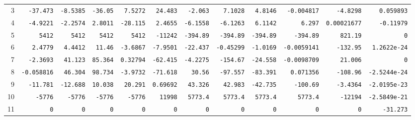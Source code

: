 \begin{landscape}
\begin{tabular}{rrrrrrrrrrrr}
3 & \texttt{-37.473} & \texttt{-8.5385} & \texttt{-36.05} & \texttt{7.5272} & \texttt{24.483} & \texttt{-2.063} & \texttt{7.1028} & \texttt{4.8146} & \texttt{-0.004817} & \texttt{-4.8298} & \texttt{0.059893} \\

4 & \texttt{-4.9221} & \texttt{-2.2574} & \texttt{2.8011} & \texttt{-28.115} & \texttt{2.4655} & \texttt{-6.1558} & \texttt{-6.1263} & \texttt{6.1142} & \texttt{6.297} & \texttt{0.00021677} & \texttt{-0.11979} \\

5 & \texttt{5412} & \texttt{5412} & \texttt{5412} & \texttt{5412} & \texttt{-11242} & \texttt{-394.89} & \texttt{-394.89} & \texttt{-394.89} & \texttt{-394.89} & \texttt{821.19} & \texttt{0} \\

6 & \texttt{2.4779} & \texttt{4.4412} & \texttt{11.46} & \texttt{-3.6867} & \texttt{-7.9501} & \texttt{-22.437} & \texttt{-0.45299} & \texttt{-1.0169} & \texttt{-0.0059141} & \texttt{-132.95} & \texttt{1.2622e-24} \\

7 & \texttt{-2.3693} & \texttt{41.123} & \texttt{85.364} & \texttt{0.32794} & \texttt{-62.415} & \texttt{-4.2275} & \texttt{-154.67} & \texttt{-24.558} & \texttt{-0.0098709} & \texttt{21.006} & \texttt{0} \\

8 & \texttt{-0.058816} & \texttt{46.304} & \texttt{98.734} & \texttt{-3.9732} & \texttt{-71.618} & \texttt{30.56} & \texttt{-97.557} & \texttt{-83.391} & \texttt{0.071356} & \texttt{-108.96} & \texttt{-2.5244e-24} \\

9 & \texttt{-11.781} & \texttt{-12.688} & \texttt{10.038} & \texttt{20.291} & \texttt{0.69692} & \texttt{43.326} & \texttt{42.983} & \texttt{-42.735} & \texttt{-100.69} & \texttt{-3.4364} & \texttt{-2.0195e-23} \\

10 & \texttt{-5776} & \texttt{-5776} & \texttt{-5776} & \texttt{-5776} & \texttt{11998} & \texttt{5773.4} & \texttt{5773.4} & \texttt{5773.4} & \texttt{5773.4} & \texttt{-12194} & \texttt{-2.5849e-21} \\

11 & \texttt{0} & \texttt{0} & \texttt{0} & \texttt{0} & \texttt{0} & \texttt{0} & \texttt{0} & \texttt{0} & \texttt{0} & \texttt{0} & \texttt{-31.273} \\

\bottomrule\end{tabular}\par\endgroup


\end{landscape}
